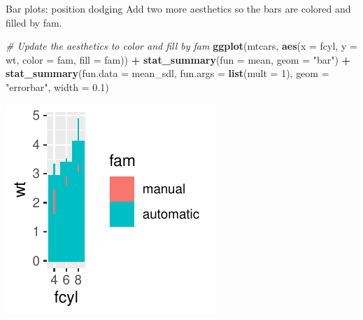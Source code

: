\documentclass[
  ignorenonframetext,
]{beamer}
\newenvironment{Shaded}{\begin{snugshade}}{\end{snugshade}}
\newcommand{\AttributeTok}[1]{\textcolor[rgb]{0.13,0.29,0.53}{#1}}
\newcommand{\CommentTok}[1]{\textcolor[rgb]{0.56,0.35,0.01}{\textit{#1}}}
\newcommand{\DecValTok}[1]{\textcolor[rgb]{0.00,0.00,0.81}{#1}}
\newcommand{\FloatTok}[1]{\textcolor[rgb]{0.00,0.00,0.81}{#1}}
\newcommand{\FunctionTok}[1]{\textcolor[rgb]{0.13,0.29,0.53}{\textbf{#1}}}
\newcommand{\NormalTok}[1]{#1}
\newcommand{\SpecialCharTok}[1]{\textcolor[rgb]{0.81,0.36,0.00}{\textbf{#1}}}
\newcommand{\StringTok}[1]{\textcolor[rgb]{0.31,0.60,0.02}{#1}}
\begin{document}
\begin{frame}[fragile]{Bar plots: position dodging}
\label{bar-plots-position-dodging-1}
Add two more aesthetics so the bars are colored and filled by fam.


\begin{Shaded}
\begin{Highlighting}[]
\CommentTok{\# Update the aesthetics to color and fill by fam}
\FunctionTok{ggplot}\NormalTok{(mtcars, }\FunctionTok{aes}\NormalTok{(}\AttributeTok{x =}\NormalTok{ fcyl, }\AttributeTok{y =}\NormalTok{ wt, }\AttributeTok{color =}\NormalTok{ fam, }\AttributeTok{fill =}\NormalTok{ fam)) }\SpecialCharTok{+}
    \FunctionTok{stat\_summary}\NormalTok{(}\AttributeTok{fun =}\NormalTok{ mean, }\AttributeTok{geom =} \StringTok{"bar"}\NormalTok{) }\SpecialCharTok{+} \FunctionTok{stat\_summary}\NormalTok{(}\AttributeTok{fun.data =}\NormalTok{ mean\_sdl,}
    \AttributeTok{fun.args =} \FunctionTok{list}\NormalTok{(}\AttributeTok{mult =} \DecValTok{1}\NormalTok{), }\AttributeTok{geom =} \StringTok{"errorbar"}\NormalTok{, }\AttributeTok{width =} \FloatTok{0.1}\NormalTok{)}
\end{Highlighting}
\end{Shaded}

\begin{center}\includegraphics[width=0.5\linewidth]{Figs/unnamed-chunk-105-1} \end{center}
\end{frame}
\end{document}

